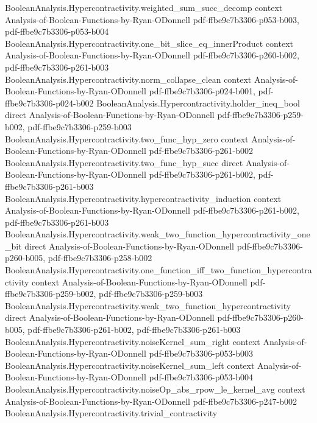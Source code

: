 \begin{theorem}
\proofstep
  {BooleanAnalysis.Hypercontractivity.weighted_sum_succ_decomp}
  {context}
  {Analysis-of-Boolean-Functions-by-Ryan-ODonnell}
  {pdf-ffbe9c7b3306-p053-b003,
    pdf-ffbe9c7b3306-p053-b004}
\proofstep
  {BooleanAnalysis.Hypercontractivity.one_bit_slice_eq_innerProduct}
  {context}
  {Analysis-of-Boolean-Functions-by-Ryan-ODonnell}
  {pdf-ffbe9c7b3306-p260-b002,
    pdf-ffbe9c7b3306-p261-b003}
\proofstep
  {BooleanAnalysis.Hypercontractivity.norm_collapse_clean}
  {context}
  {Analysis-of-Boolean-Functions-by-Ryan-ODonnell}
  {pdf-ffbe9c7b3306-p024-b001,
    pdf-ffbe9c7b3306-p024-b002}
\proofstep
  {BooleanAnalysis.Hypercontractivity.holder_ineq_bool}
  {direct}
  {Analysis-of-Boolean-Functions-by-Ryan-ODonnell}
  {pdf-ffbe9c7b3306-p259-b002,
    pdf-ffbe9c7b3306-p259-b003}
\proofstep
  {BooleanAnalysis.Hypercontractivity.two_func_hyp_zero}
  {context}
  {Analysis-of-Boolean-Functions-by-Ryan-ODonnell}
  {pdf-ffbe9c7b3306-p261-b002}
\proofstep
  {BooleanAnalysis.Hypercontractivity.two_func_hyp_succ}
  {direct}
  {Analysis-of-Boolean-Functions-by-Ryan-ODonnell}
  {pdf-ffbe9c7b3306-p261-b002,
    pdf-ffbe9c7b3306-p261-b003}
\proofstep
  {BooleanAnalysis.Hypercontractivity.hypercontractivity_induction}
  {context}
  {Analysis-of-Boolean-Functions-by-Ryan-ODonnell}
  {pdf-ffbe9c7b3306-p261-b002,
    pdf-ffbe9c7b3306-p261-b003}
\proofstep
  {BooleanAnalysis.Hypercontractivity.weak_two_function_hypercontractivity_one_bit}
  {direct}
  {Analysis-of-Boolean-Functions-by-Ryan-ODonnell}
  {pdf-ffbe9c7b3306-p260-b005,
    pdf-ffbe9c7b3306-p258-b002}
\proofstep
  {BooleanAnalysis.Hypercontractivity.one_function_iff_two_function_hypercontractivity}
  {context}
  {Analysis-of-Boolean-Functions-by-Ryan-ODonnell}
  {pdf-ffbe9c7b3306-p259-b002,
    pdf-ffbe9c7b3306-p259-b003}
\proofstep
  {BooleanAnalysis.Hypercontractivity.weak_two_function_hypercontractivity}
  {direct}
  {Analysis-of-Boolean-Functions-by-Ryan-ODonnell}
  {pdf-ffbe9c7b3306-p260-b005,
    pdf-ffbe9c7b3306-p261-b002,
    pdf-ffbe9c7b3306-p261-b003}
\proofstep
  {BooleanAnalysis.Hypercontractivity.noiseKernel_sum_right}
  {context}
  {Analysis-of-Boolean-Functions-by-Ryan-ODonnell}
  {pdf-ffbe9c7b3306-p053-b003}
\proofstep
  {BooleanAnalysis.Hypercontractivity.noiseKernel_sum_left}
  {context}
  {Analysis-of-Boolean-Functions-by-Ryan-ODonnell}
  {pdf-ffbe9c7b3306-p053-b004}
\proofstep
  {BooleanAnalysis.Hypercontractivity.noiseOp_abs_rpow_le_kernel_avg}
  {context}
  {Analysis-of-Boolean-Functions-by-Ryan-ODonnell}
  {pdf-ffbe9c7b3306-p247-b002}
\proofstep
  {BooleanAnalysis.Hypercontractivity.trivial_contractivity}

\end{theorem}
